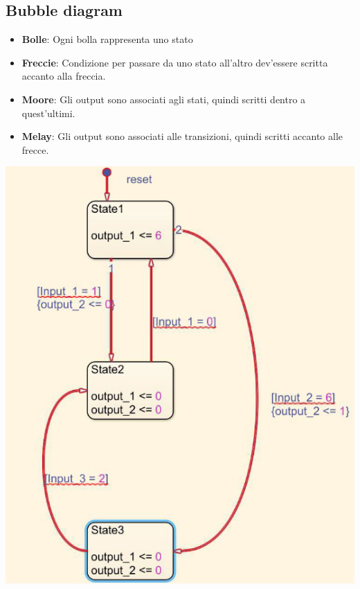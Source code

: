     \subsection{Bubble diagram}
        \begin{minipage} [t]{0.48\columnwidth}
            \vspace{0pt} %
            \begin{itemize}
                \item \textbf{Bolle}: Ogni bolla rappresenta uno stato
                \item \textbf{Freccie}: Condizione per passare da uno stato all'altro dev'essere scritta accanto alla freccia.
                \item \textbf{Moore}: Gli output sono associati agli stati, quindi scritti dentro a quest'ultimi.
                \item \textbf{Melay}: Gli output sono associati alle transizioni, quindi scritti accanto alle frecce.
            \end{itemize}
        \end{minipage}
        \begin{minipage} [t]{0.48\columnwidth}
            \vspace{0pt} %
            \includegraphics[width=\linewidth]{Images/BubbleDiagram.png}
        \end{minipage}